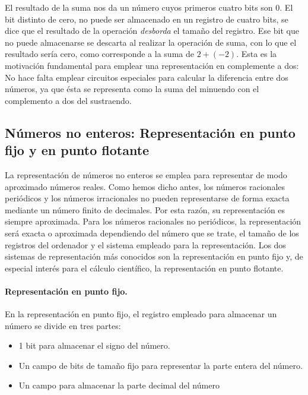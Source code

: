 \begin{paracol}{2}
El resultado de la suma nos da un número cuyos primeros cuatro bits son 0. El bit distinto de cero, no puede ser almacenado en un registro de cuatro bits, se dice que el resultado de la operación \emph{desborda} el tamaño del registro. Ese bit que no puede almacenarse se descarta al realizar la operación de suma, con lo que el resultado sería cero, como corresponde a la suma de $2+(-2)$. Esta es la motivación fundamental para emplear una representación en complemente a dos: No hace falta emplear circuitos especiales para calcular la diferencia entre dos números, ya que ésta se representa como la suma del minuendo con el complemento a dos del sustraendo.

\subsection{Números no enteros: Representación en punto fijo y en punto flotante}
La representación de números no enteros se emplea para representar de modo aproximado números reales. Como hemos dicho antes, los números racionales periódicos y los números irracionales no pueden representarse de forma exacta mediante un número finito de decimales. Por esta razón, su representación es siempre aproximada. Para los números racionales no periódicos, la representación será exacta o aproximada dependiendo del número que se trate, el tamaño de los registros del ordenador y el sistema empleado para la representación. Los dos sistemas de representación más conocidos son la representación en  punto fijo y, de especial interés para el cálculo científico, la representación en punto flotante.

\paragraph*{Representación en punto fijo.} En la representación en punto fijo, el registro empleado para almacenar un número se divide en tres partes: 
\begin{itemize}
\item 1 bit para almacenar el signo del número.  
\item Un campo de bits de tamaño fijo para representar la parte entera del número.
\item Un campo para almacenar la parte decimal del número
\end{itemize}


\end{paracol}
